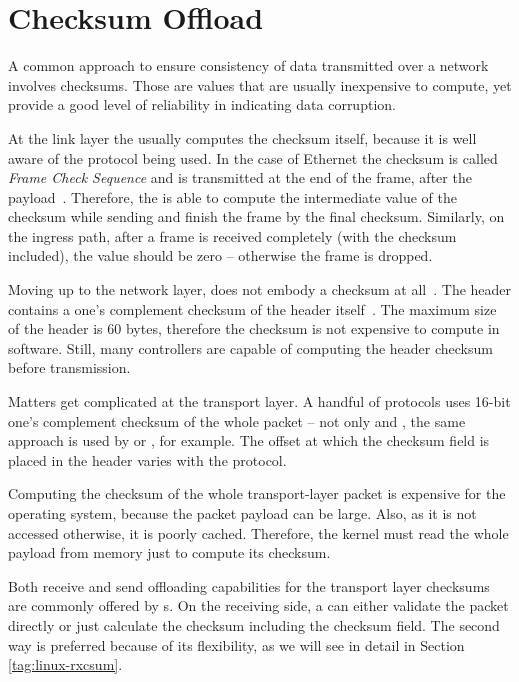 \section{Checksum Offload}

A common approach to ensure consistency of data transmitted over a network
involves checksums. Those are values that are usually inexpensive to compute,
yet provide a good level of reliability in indicating data corruption.

At the link layer the  usually computes the checksum itself, because it
is well aware of the protocol being used. In the case of Ethernet the
checksum is called \emph{Frame Check Sequence} and is transmitted at the end of
the frame, after the payload~\cite{ethernet}. Therefore, the  is able to
compute the intermediate value of the checksum while sending and finish the frame
by the final checksum. Similarly, on the ingress path, after a frame is received
completely (with the checksum included), the value should be zero -- otherwise
the frame is dropped.

Moving up to the network layer,  does not embody a checksum at
all~\cite{RFC2460}. The  header contains a one's complement checksum of the
header itself~\cite{RFC0791}. The maximum size of the header is 60 bytes,
therefore the checksum is not expensive to compute in software. Still, many controllers are
capable of computing the  header checksum before transmission.

Matters get complicated at the transport layer. A handful of protocols uses 16-bit
one's complement checksum of the whole packet -- not only  and ,
the same approach is used by  or , for example. The offset at
which the checksum field is placed in the header varies with the protocol.

Computing the checksum of the whole transport-layer packet is expensive for the
operating system, because the packet payload can be large. Also, as it is not
accessed otherwise, it is poorly cached. Therefore, the kernel must read the
whole payload from memory just to compute its checksum.

Both receive and send offloading capabilities for the transport layer checksums are
commonly offered by s. On the receiving side, a  can either
validate the packet directly or just calculate the checksum including the
checksum field. The second way is preferred because of its flexibility, as we
will see in detail in Section \ref{tag:linux-rxcsum}.

